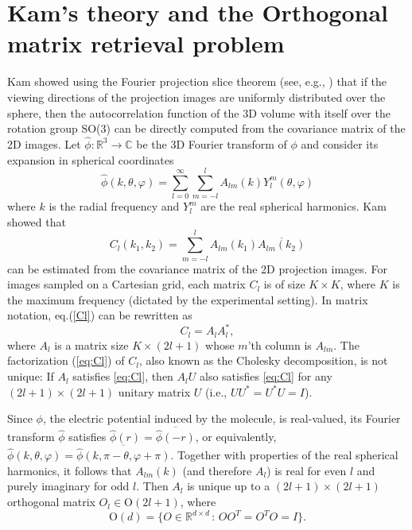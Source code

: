 \documentclass{article}
\begin{document}
\section{Kam's theory and the Orthogonal matrix retrieval problem}

Kam showed \cite{kam1980} using the Fourier projection slice theorem (see, e.g., \cite[p. 11]{Natr2001a}) that if the viewing
directions of the projection images are uniformly distributed over the sphere, then the
autocorrelation function of the 3D volume with itself over the rotation group
SO(3) can be directly computed from the
covariance matrix of the 2D images. Let $\hat \phi : \mathbb{R}^3 \to \mathbb{C}$ be the 3D Fourier
transform of $\phi$ and consider its expansion in spherical coordinates 
\begin{equation}
\hat{\phi}(k,\theta,\varphi) = \sum_{l=0}^{\infty} \sum_{m=-l}^{l} A_{lm}(k) Y_l^m
(\theta, \varphi)
\end{equation}
where $k$ is the radial frequency and $Y_l^m$ are the real spherical
harmonics. Kam showed that   
\begin{equation}
\label{Cl}
C_l(k_1,k_2) = \sum_{m=-l}^l A_{lm}(k_1)\overline{A_{lm}(k_2)}  
\end{equation}
can be estimated from the covariance matrix of the 2D projection images. For images sampled on a Cartesian grid, each matrix $C_l$ is of size $K\times K$, where $K$ is the maximum frequency (dictated by the experimental setting). In matrix notation, eq.(\ref{Cl}) can be rewritten as
\begin{equation}
C_l=A_l A_l^*, \label{eq:Cl}
\end{equation}
where $A_l$ is a matrix size
$K \times (2l+1)$ whose $m$'th column is $A_{lm}$. 
The factorization (\ref{eq:Cl}) of $C_l$, also known as the Cholesky decomposition, is not unique: If
$A_l$ satisfies \eqref{eq:Cl}, then $A_lU$ also satisfies \eqref{eq:Cl} for any $(2l+1) \times (2l+1)$ unitary matrix
$U$ (i.e., $UU^* = U^*U = I$). 

Since $\phi$, the electric potential induced by the molecule, is
real-valued, its Fourier transform $\hat{\phi}$ satisfies
$\hat{\phi}(r)=\overline{\hat{\phi}(-r)}$, or equivalently,
$\hat{\phi}(k,\theta,\varphi)=\overline{\hat{\phi}(k,\pi-\theta,\varphi+\pi)}$.
Together with properties of the real spherical harmonics, it follows that
$A_{lm}(k)$ (and therefore $A_l$) is real for even
$l$ and purely imaginary for odd $l$. Then $A_l$ is unique up to a
$(2l+1)\times (2l+1)$ orthogonal matrix $O_l\in \text{O}(2l+1)$, where 
\begin{equation}
\text{O}(d)=\{O\in \mathbb{R}^{d\times d} \,:\, OO^T=O^TO=I \}.
\end{equation}
\end{document}
